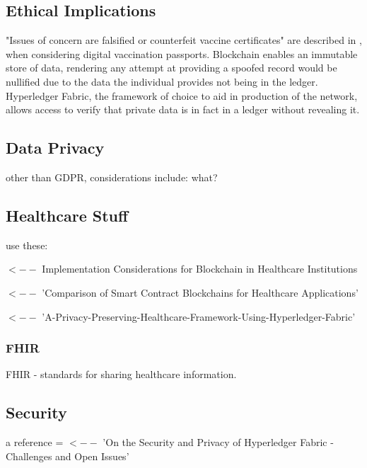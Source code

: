 \documentclass{report}
\begin{document}
\begin{flushleft}
\subsection{Ethical Implications}

"Issues of concern are falsified or counterfeit vaccine certificates" are described in \cite{schlagenhauf_variants_2021}, when considering digital vaccination passports. 
Blockchain enables an immutable store of data, rendering any attempt at providing a spoofed record would be nullified due to the data the individual provides not being in the ledger.
Hyperledger Fabric, the framework of choice to aid in production of the network, allows access to verify that private data is in fact in a ledger without revealing it. %

\subsection{Data Privacy}

other than GDPR, considerations include: what?

\subsection{Healthcare Stuff} %


use these: 

\cite{paranjape_implementation_2019} $ <-- $ Implementation Considerations for Blockchain in Healthcare Institutions

\cite{yu_comparison_2020} $<--$ 'Comparison of Smart Contract Blockchains for Healthcare Applications'

\cite{stamatellis_privacy-preserving_2020} $<--$ 'A-Privacy-Preserving-Healthcare-Framework-Using-Hyperledger-Fabric'

\subsubsection{FHIR}
FHIR - standards for sharing healthcare information.\linebreak[1]

\subsection{Security}

a reference = \cite{brotsis_security_2020} $<--$ 'On the Security and Privacy of Hyperledger Fabric - Challenges and Open Issues'


\end{flushleft}
\end{document}
